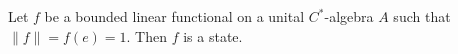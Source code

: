 Let $f$ be a bounded linear functional on a unital $C^*$-algebra $A$ such that $\|f\| = f(e) = 1$. Then $f$ is a state.

